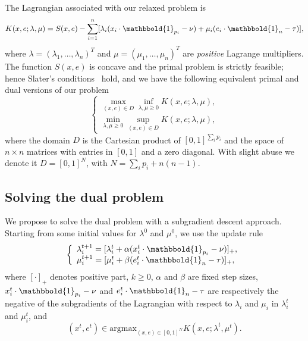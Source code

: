 \documentclass[10pt,twocolumn,letterpaper]{article}
\numberwithin{theorem}{section}
\begin{document}
The Lagrangian associated with our relaxed problem is
\begin{equation}
  K(x,e;\lambda,\mu)= S(x,e)-\sum_{i=1}^n[ \lambda_i
    (x_i\cdot\mathbbold{1}_{p_i}-\nu) +\mu_i
    (e_i\cdot\mathbbold{1}_n-\tau)],
\label{eq:lag}
\end{equation}
where $\lambda=(\lambda_1,\ldots,\lambda_n)^T$ and
$\mu=(\mu_1,\ldots,\mu_n)^T$ are {\em positive} Lagrange multipliers.
The function $S(x, e)$ is concave and the primal problem is strictly
feasible; hence Slater's conditions~\cite{Slater50} hold, and we have the following
equivalent primal and dual versions of our problem
\begin{equation}
\left\{\begin{array}{l}
\max_{(x,e)\in D} \inf_{\lambda,\mu\ge 0} K(x,e;\lambda,\mu),
\\
\min_{\lambda,\mu\ge 0} \sup_{(x,e)\in D} K(x,e;\lambda,\mu),
\end{array}\right.
\label{eq:dual}
\end{equation}
where the domain $D$ is the Cartesian product of 
$[0,1]^{\sum_i p_i}$ 
and the space of
$n\times n$ matrices with entries in $[0,1]$ and a zero diagonal. With slight abuse we denote it $D=[0,1]^N$, with $N=\sum_ip_i + n(n-1)$.

\subsection{Solving the dual problem}
We propose to solve the dual problem with a subgradient descent
approach. Starting from some initial values for $\lambda^0$ and
$\mu^0$, we use the update rule
\begin{equation}
\left\{\begin{array}{l}
\lambda_i^{t+1}=[\lambda_i^t+\alpha (x_i^t\cdot\mathbbold{1}_{p_i}-\nu)]_+,\\
\mu_i^{t+1}=[\mu_i^t+\beta (e_i^t\cdot\mathbbold{1}_n-\tau)]_+,\\
\end{array}\right.
\label{eq:update_ln}
\end{equation}
where $[\cdot]_+$ denotes positive part, $k\ge 0$, $\alpha$ and $\beta$ are fixed step sizes, 
$x_i^t\cdot\mathbbold{1}_{p_i}-\nu$ and $e_i^t\cdot\mathbbold{1}_n-\tau$ are
respectively the negative of the subgradients of the Lagrangian with
respect to $\lambda_i$ and $\mu_i$ in $\lambda_i^t$ and $\mu_i^t$, and
\begin{equation}
(x^t,e^t)\in\text{argmax}_{(x,e)\in[0,1]^N} K(x,e;\lambda^t,\mu^t). 
\end{equation}
\end{document}

